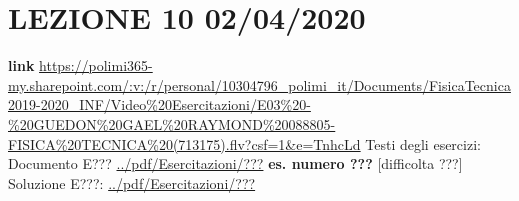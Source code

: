 \section*{LEZIONE 10 02/04/2020}
\textbf{link} \url{https://polimi365-my.sharepoint.com/:v:/r/personal/10304796_polimi_it/Documents/FisicaTecnica2019-2020_INF/Video%20Esercitazioni/E03%20-%20GUEDON%20GAEL%20RAYMOND%20088805-FISICA%20TECNICA%20(713175).flv?csf=1&e=TnhcLd}\newline
\newline
Testi degli esercizi:\newline
Documento E??? \url{../pdf/Esercitazioni/???}\newline
\textbf{es. numero ???} [difficolta ???]\newline
Soluzione E???: \url{../pdf/Esercitazioni/???}
